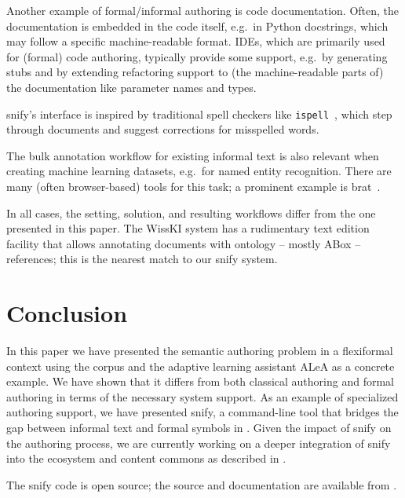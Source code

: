 \documentclass[runningheads]{llncs}
\newcommand\ALeA{\textsf{ALeA}\xspace}
\newcommand\snify{\textsf{snify}\xspace}
\begin{document}
Another example of formal/informal authoring is code documentation.
Often, the documentation is embedded in the code itself,
e.g.\ in Python docstrings, which may follow a specific
machine-readable format.
IDEs, which are primarily used for (formal) code authoring,
typically provide some support, e.g.\ by generating stubs
and by extending refactoring support
to (the machine-readable parts of) the documentation
like parameter names and types.

\snify's interface is inspired by traditional spell checkers
like \lstinline|ispell|~\cite{ispellman},
which step through documents and suggest corrections for misspelled words.

The bulk annotation workflow for existing informal text is also relevant when creating
machine learning datasets, e.g.\ for named entity recognition.  There are many (often
browser-based) tools for this task; a prominent example is
\textsf{brat}~\cite{brat:on}.

In all cases, the setting, solution, and resulting workflows differ from the one presented
in this paper. The WissKI system \cite{goerz2010adaptation} has a rudimentary text edition
facility that allows annotating documents with ontology -- mostly ABox -- references; this
is the nearest match to our \snify system.

\section{Conclusion}\label{sec:conclusion}
In this paper we have presented the semantic authoring problem in a flexiformal context
using the \sTeX corpus and the adaptive learning assistant \ALeA as a concrete example. We
have shown that it differs from both classical authoring and formal authoring in terms of
the necessary system support. As an example of specialized authoring support, we have
presented \snify, a command-line tool that bridges the gap between informal text and
formal symbols in \sTeX.  Given the impact of \snify on the authoring process, we are
currently working on a deeper integration of \snify into the \sTeX ecosystem and content
commons as described in . 

The \snify code is open source; the source and documentation are available from
\cite{stextools:git}.
\end{document}
